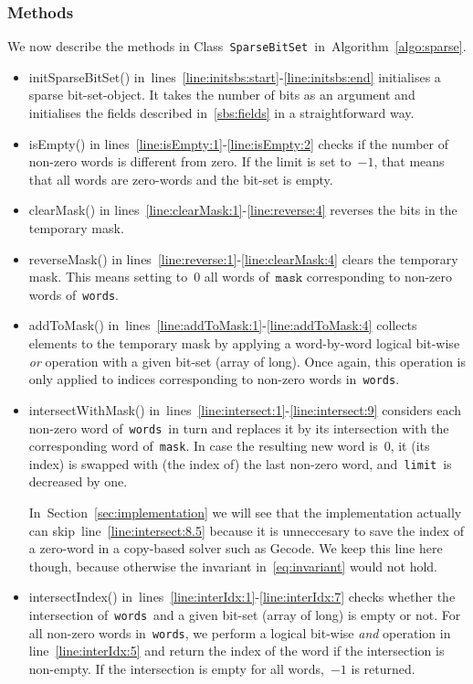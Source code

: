 \documentclass[a4paper,11pt]{article}
\newcommand{\Secref}[1]{Section~\ref{#1}}
\newcommand{\Algoref}[1]{Algorithm~\ref{#1}}
\newcommand{\lineref}[1]{line~\ref{#1}}
\newcommand{\linesref}[2]{lines~\ref{#1}-\ref{#2}}
\newcommand{\Eqref}[1]{\eqref{#1}}
\newcommand{\Words}{\texttt{words}}
\newcommand{\Mask}{\texttt{mask}}
\newcommand{\Limit}{\texttt{limit}}
\newcommand{\SparseBitSet}{\texttt{SparseBitSet}}
\numberwithin{equation}{section}
\begin{document}
\subsubsection{Methods}
We now describe the methods in Class~\SparseBitSet~in~\Algoref{algo:sparse}.

\begin{itemize}
  \item initSparseBitSet() in~\linesref{line:initsbs:start}{line:initsbs:end}
    initialises a sparse bit-set-object. It takes 
    the number of bits as an argument and initialises the fields
    described in~\ref{sbs:fields} in a straightforward way.

  \item isEmpty() in lines~\ref{line:isEmpty:1}-\ref{line:isEmpty:2} checks
    if the number of non-zero words is different from zero. If the limit is
    set to~$-1$, that means that all words are zero-words and the bit-set
    is empty.

  \item clearMask() in lines~\ref{line:clearMask:1}-\ref{line:reverse:4}
    reverses the bits in the temporary mask.

  \item reverseMask() in lines~\ref{line:reverse:1}-\ref{line:clearMask:4}
    clears the temporary mask. This means setting to~$0$ all words of~$\Mask$
    corresponding to non-zero words of~\Words.
    

  \item addToMask() in~\linesref{line:addToMask:1}{line:addToMask:4} collects
    elements to the temporary mask by applying a word-by-word logical bit-wise
    \emph{or} operation with a given bit-set (array of long).
    Once again, this operation is only applied to indices corresponding to
    non-zero words in~\Words.

  \item intersectWithMask() in~\linesref{line:intersect:1}{line:intersect:9}
    considers each non-zero word of~\Words~in turn
    and replaces it by its intersection with the corresponding word of~\Mask.
    In case the resulting new word is~$0$, it (its index) is swapped with
    (the index of) the last non-zero word, and~\Limit~is
    decreased by one.
    
    In~\Secref{sec:implementation} we will see that the implementation
    actually can skip~\lineref{line:intersect:8.5} because it is unneccesary
    to save the index of a zero-word in a copy-based solver such as Gecode.
    We keep this
    line here though, because otherwise the invariant in~\Eqref{eq:invariant} 
    would not hold.
    
  \item intersectIndex() in~\linesref{line:interIdx:1}{line:interIdx:7}
    checks whether the intersection of~\Words~and a given bit-set
    (array of long) is empty or not. For all non-zero words in~\Words,
    we perform a logical bit-wise \emph{and} operation 
    in line~\ref{line:interIdx:5} and return
    the index of the word if the intersection is non-empty. If the
    intersection is empty for all words,~$-1$ is returned.
\end{itemize}
\end{document}
